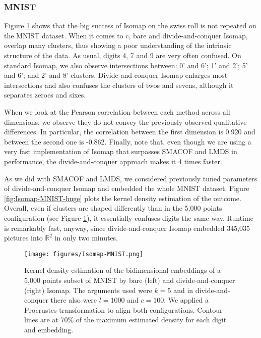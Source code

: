 \subsubsection{MNIST}

Figure \ref{fig:Isomap-MNIST} shows that the big success of Isomap on the swiss roll is not repeated on the MNIST dataset. When it comes to c, bare and divide-and-conquer Isomap, overlap many clusters, thus showing a poor understanding of the intrinsic structure of the data. As usual, digits 4, 7 and 9 are very often confused. On standard Isomap, we also observe intersections between: 0' and 6'; 1' and 2'; 5' and 6'; and 2' and 8' clusters. Divide-and-conquer Isomap enlarges most intersections and also confuses the clusters of twos and sevens, although it separates zeroes and sixes.

When we look at the Pearson correlation between each method across all dimensions, we observe they do not convey the previously observed qualitative differences. In particular, the correlation between the first dimension is 0.920 and between the second one is -0.862. Finally, note that, even though we are using a very fast implementation of Isomap that surpasses SMACOF and LMDS in performance, the divide-and-conquer approach makes it 4 times faster.

As we did with SMACOF and LMDS, we considered previously tuned parameters of divide-and-conquer Isomap and embedded the whole MNIST dataset. Figure \ref{fig:Isomap-MNIST-huge} plots the kernel density estimation of the outcome. Overall, even if clusters are shaped differently than in the 5,000 points configuration (see Figure \ref{fig:Isomap-MNIST}), it essentially confuses  digits the same way. Runtime is remarkably fast, anyway, since divide-and-conquer Isomap embedded 345,035 pictures into $\mathbb{R}^2$ in only two minutes.

\begin{figure}
    \centering
    \texttt{[image: figures/Isomap-MNIST.png]}
    \caption{Kernel density estimation of the bidimensional embeddings of a 5,000 points subset of MNIST \citep{Cohen2017} by bare (left) and divide-and-conquer (right) Isomap. The arguments used were $k=5$ and in divide-and-conquer there also were $l=1000$ and $c=100$. We applied a Procrustes transformation to align both configurations. Contour lines are at 70\% of the maximum estimated density for each digit and embedding.}
    \label{fig:Isomap-MNIST}
\end{figure}

